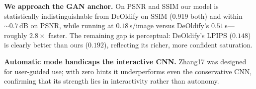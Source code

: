 \textbf{We approach the GAN anchor.} On PSNR and SSIM our model is statistically
indistinguishable from DeOldify on SSIM ($0.919$ both) and within
${\sim}0.7$\,dB on PSNR, while running at $0.18$\,s/image versus DeOldify's
$0.51$\,s---roughly $2.8\times$ faster. The remaining gap is perceptual:
DeOldify's LPIPS ($0.148$) is clearly better than ours ($0.192$), reflecting its
richer, more confident saturation.

\textbf{Automatic mode handicaps the interactive CNN.} Zhang17 was designed for
user-guided use; with zero hints it underperforms even the conservative CNN,
confirming that its strength lies in interactivity rather than autonomy.
